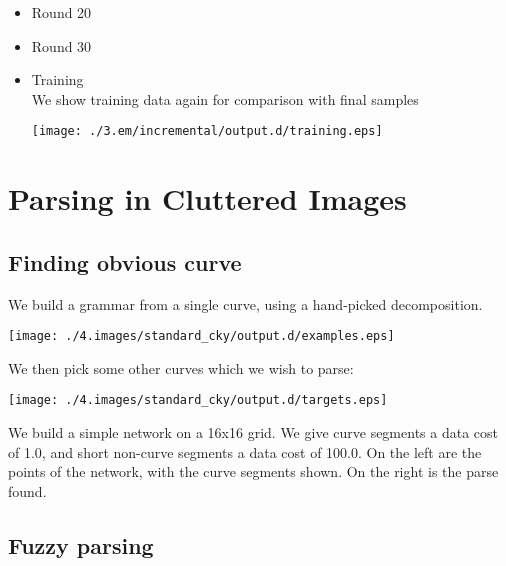 \documentclass{book}
\begin{document}
\begin{itemize}
\item Round 20\\
\label{sec-3_4_4_12}%



\item Round 30\\
\label{sec-3_4_4_13}%


\item Training\\
\label{sec-3_4_4_14}%
We show training data again for comparison with final samples
 
\texttt{[image: ./3.em/incremental/output.d/training.eps]}

\end{itemize} %
\section{Parsing in Cluttered Images}
\label{sec-3_5}
\subsection{Finding obvious curve}
\label{sec-3_5_1}


We build a grammar from a single curve, using a hand-picked
decomposition.

\texttt{[image: ./4.images/standard\_cky/output.d/examples.eps]}

We then pick some other curves which we wish to parse:

\texttt{[image: ./4.images/standard\_cky/output.d/targets.eps]}

We build a simple network on a 16x16 grid. We give curve segments a
data cost of 1.0, and short non-curve segments a data cost of 100.0.
On the left are the points of the network, with the curve segments
shown. On the right is the parse found.
\subsection{Fuzzy parsing}
\label{sec-3_5_2}
\end{document}

